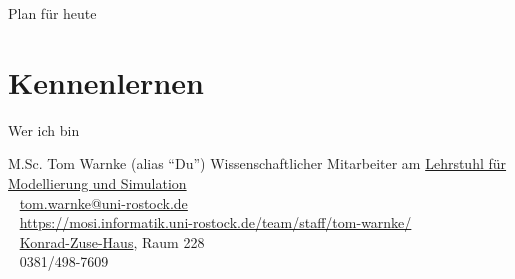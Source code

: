 \documentclass[10pt]{beamer} %
\date{15.10.2019} %
\begin{document}
\maketitle  

\begin{frame}{Plan für heute}

	\tableofcontents

\end{frame}

\section{Kennenlernen}

\begin{frame}{Wer ich bin}
	
	\begin{block}{M.Sc. Tom Warnke (alias \enquote{Du})}
		Wissenschaftlicher Mitarbeiter am \href{https://mosi.informatik.uni-rostock.de}{Lehrstuhl für Modellierung und Simulation}\\
		\MVAt~ \href{mailto:tom.warnke@uni-rostock.de}{tom.warnke@uni-rostock.de}\\
		\Mundus~ \href{https://mosi.informatik.uni-rostock.de/team/staff/tom-warnke/}{https://mosi.informatik.uni-rostock.de/team/staff/tom-warnke/}\\
		\Letter~ \href{https://www.informatik.uni-rostock.de/ueber_uns/konrad_zuse_haus/}{Konrad-Zuse-Haus}, Raum 228\\
		\Telefon~ 0381/498-7609\\
	\end{block}
	
\end{frame}
\end{document}
